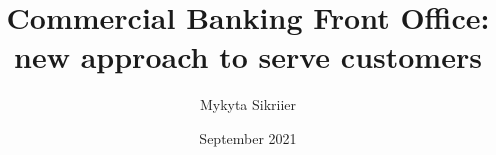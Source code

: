 \documentclass{master_thesis}
\author{Mykyta Sikriier}
\title{
    Commercial Banking Front Office: new approach to serve customers
}
\date{September 2021}
\begin{document}
\maketitle

\makesummary

\tableofcontents
















\end{document}
